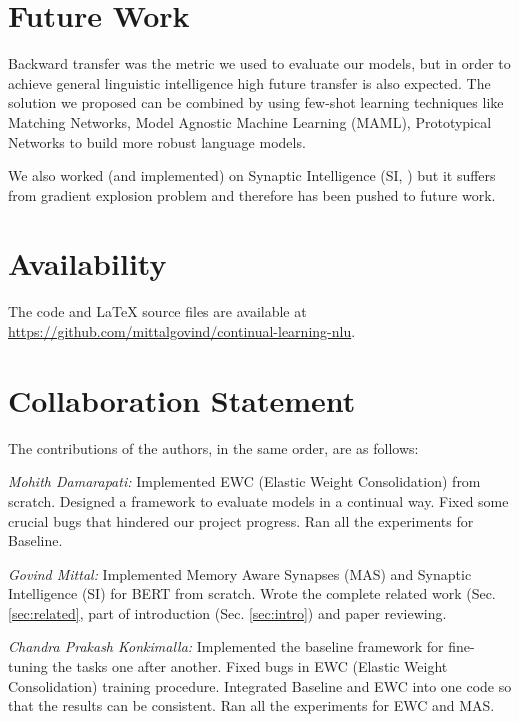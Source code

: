 \documentclass[11pt,a4paper]{article}
\begin{document}
\section{Future Work}
Backward transfer was the metric we used to evaluate our models, but in order to achieve general linguistic intelligence high future transfer is also expected. The solution we proposed can be combined by using few-shot learning techniques like Matching Networks, Model Agnostic Machine Learning (MAML), Prototypical Networks to build more robust language models.

We also worked (and implemented) on Synaptic Intelligence (SI, \citealt{DBLP:journals/corr/ZenkePG17}) but it suffers from gradient explosion problem and therefore has been pushed to future work.

\section*{Availability}
The code and \LaTeX{} source files are available at \url{https://github.com/mittalgovind/continual-learning-nlu}.


\section*{Collaboration Statement}
The contributions of the authors, in the same order, are as follows:

\textit{Mohith Damarapati:} Implemented EWC  (Elastic Weight Consolidation) from scratch.  Designed a framework to evaluate models in a continual way.  Fixed some crucial bugs that hindered our project progress. Ran all the experiments for Baseline.

\textit{Govind Mittal:} Implemented Memory Aware Synapses  (MAS) and Synaptic Intelligence  (SI) for BERT from scratch. Wrote the complete related work  (Sec. \ref{sec:related}, part of introduction  (Sec. \ref{sec:intro}) and paper reviewing. 

\textit{Chandra Prakash Konkimalla:} Implemented the baseline framework for fine-tuning the tasks one after another. Fixed bugs in EWC  (Elastic Weight Consolidation) training procedure. Integrated Baseline and EWC into one code so that the results can be consistent. Ran all the experiments for EWC and MAS.

\end{document}
